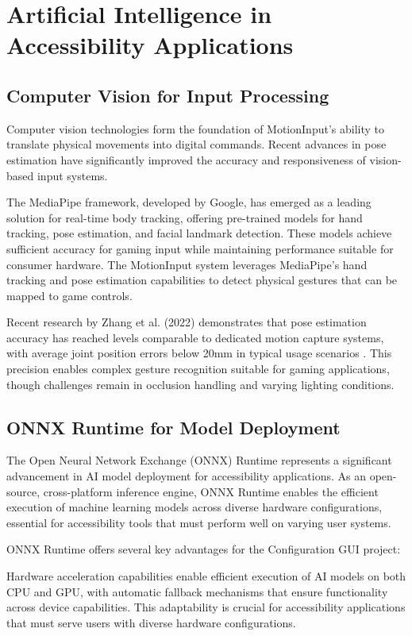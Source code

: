 \section{Artificial Intelligence in Accessibility Applications}
\subsection{Computer Vision for Input Processing}
Computer vision technologies form the foundation of MotionInput's ability to translate physical movements into digital commands. Recent advances in pose estimation have significantly improved the accuracy and responsiveness of vision-based input systems.

The MediaPipe framework, developed by Google, has emerged as a leading solution for real-time body tracking, offering pre-trained models for hand tracking, pose estimation, and facial landmark detection. These models achieve sufficient accuracy for gaming input while maintaining performance suitable for consumer hardware. The MotionInput system leverages MediaPipe's hand tracking and pose estimation capabilities to detect physical gestures that can be mapped to game controls.

Recent research by Zhang et al. (2022) demonstrates that pose estimation accuracy has reached levels comparable to dedicated motion capture systems, with average joint position errors below 20mm in typical usage scenarios \cite{zhang2022}. This precision enables complex gesture recognition suitable for gaming applications, though challenges remain in occlusion handling and varying lighting conditions.

\subsection{ONNX Runtime for Model Deployment}
The Open Neural Network Exchange (ONNX) Runtime represents a significant advancement in AI model deployment for accessibility applications. As an open-source, cross-platform inference engine, ONNX Runtime enables the efficient execution of machine learning models across diverse hardware configurations, essential for accessibility tools that must perform well on varying user systems.

ONNX Runtime offers several key advantages for the Configuration GUI project:

Hardware acceleration capabilities enable efficient execution of AI models on both CPU and GPU, with automatic fallback mechanisms that ensure functionality across device capabilities. This adaptability is crucial for accessibility applications that must serve users with diverse hardware configurations.

